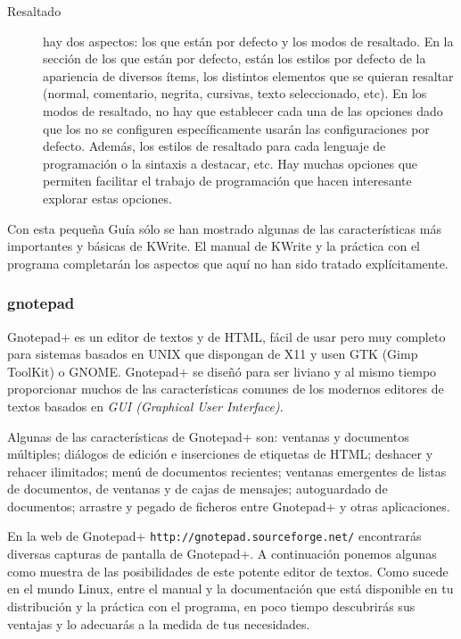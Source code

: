 \begin{description}
\item  [Resaltado]  hay  dos  aspectos:  los  que  están  por  defecto
y  los  modos  de resaltado.  En  la  sección  de  los que  están  por
defecto, están  los estilos por  defecto de la apariencia  de diversos
ítems,  los  distintos  elementos  que se  quieran  resaltar  (normal,
comentario, negrita, cursivas, texto  seleccionado, etc). En los modos
de resaltado, no hay que establecer  cada una de las opciones dado que
los no  se configuren  específicamente usarán las  configuraciones por
defecto.  Además,  los estilos  de  resaltado  para cada  lenguaje  de
programación o  la sintaxis a  destacar, etc. Hay muchas  opciones que
permiten facilitar  el trabajo  de programación que  hacen interesante
explorar estas opciones.

\end{description}

Con  esta   pequeña  Guía  sólo   se  han  mostrado  algunas   de  las
características más importantes  y básicas de {\sf  KWrite}. El manual
de {\sf KWrite} y la práctica con el programa completarán los aspectos
que aquí no han sido tratado explícitamente.


\subsubsection*{gnotepad}

{\sf Gnotepad+} es un  editor de textos y de HTML,  fácil de usar pero
muy completo para sistemas basados en UNIX que dispongan de X11 y usen
{\sf  GTK (Gimp  ToolKit)} o  {\sf GNOME}.  {\sf Gnotepad+}  se diseñó
para  ser  liviano  y  al  mismo tiempo  proporcionar  muchos  de  las
características comunes de los modernos  editores de textos basados en
{\em GUI (Graphical User Interface)}.

Algunas  de las  características de  {\sf Gnotepad+}  son: ventanas  y
documentos múltiples;  diálogos de edición e  inserciones de etiquetas
de HTML; deshacer y rehacer  ilimitados; menú de documentos recientes;
ventanas emergentes de listas de documentos, de ventanas y de cajas de
mensajes; autoguardado  de documentos;  arrastre y pegado  de ficheros
entre {\sf Gnotepad+} y otras aplicaciones.

En la  web de  {\sf Gnotepad+}  {\tt http://gnotepad.sourceforge.net/}
encontrarás  diversas  capturas  de  pantalla de  {\sf  Gnotepad+}.  A
continuación ponemos algunas como muestra de las posibilidades de este
potente editor  de textos.  Como sucede  en el  mundo Linux,  entre el
manual y la documentación que está  disponible en tu distribución y la
práctica con el programa, en poco tiempo descubrirás sus ventajas y lo
adecuarás a la medida de tus necesidades.

